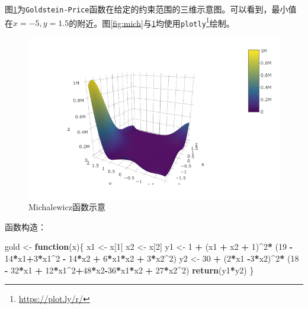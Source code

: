 \documentclass[]{ctexbook}
\newenvironment{Shaded}{\begin{snugshade}}{\end{snugshade}}
\newcommand{\KeywordTok}[1]{\textcolor[rgb]{0.13,0.29,0.53}{\textbf{#1}}}
\newcommand{\DecValTok}[1]{\textcolor[rgb]{0.00,0.00,0.81}{#1}}
\newcommand{\StringTok}[1]{\textcolor[rgb]{0.31,0.60,0.02}{#1}}
\newcommand{\ControlFlowTok}[1]{\textcolor[rgb]{0.13,0.29,0.53}{\textbf{#1}}}
\newcommand{\OperatorTok}[1]{\textcolor[rgb]{0.81,0.36,0.00}{\textbf{#1}}}
\newcommand{\NormalTok}[1]{#1}
\renewcommand{\href}[2]{#2\footnote{\url{#1}}}
\theoremstyle{definition}
\theoremstyle{definition}
\theoremstyle{definition}
\theoremstyle{remark}
\begin{document}
图\ref{fig:gold}为\texttt{Goldstein-Price}函数在给定的约束范围的三维示意图。可以看到，最小值在\(x = -5,y = 1.5\)的附近。图\ref{fig:mich}与\ref{fig:gold}均使用\href{https://plot.ly/r/}{\texttt{plotly}}绘制。

\begin{figure}

{\centering \includegraphics[width=0.8\linewidth]{img/gold} 

}

\caption{ Michalewicz函数示意}\label{fig:gold}
\end{figure}

函数构造：

\begin{Shaded}
\begin{Highlighting}[]
\NormalTok{gold <-}\StringTok{ }\ControlFlowTok{function}\NormalTok{(x)\{}
\NormalTok{  x1 <-}\StringTok{ }\NormalTok{x[}\DecValTok{1}\NormalTok{]}
\NormalTok{  x2 <-}\StringTok{ }\NormalTok{x[}\DecValTok{2}\NormalTok{]}
\NormalTok{  y1 <-}\StringTok{ }\DecValTok{1} \OperatorTok{+}\StringTok{ }\NormalTok{(x1 }\OperatorTok{+}\StringTok{ }\NormalTok{x2 }\OperatorTok{+}\StringTok{ }\DecValTok{1}\NormalTok{)}\OperatorTok{^}\DecValTok{2}\OperatorTok{*}
\StringTok{    }\NormalTok{(}\DecValTok{19} \OperatorTok{-}\StringTok{ }\DecValTok{14}\OperatorTok{*}\NormalTok{x1}\OperatorTok{+}\DecValTok{3}\OperatorTok{*}\NormalTok{x1}\OperatorTok{^}\DecValTok{2} \OperatorTok{-}\StringTok{ }\DecValTok{14}\OperatorTok{*}\NormalTok{x2 }\OperatorTok{+}\StringTok{ }\DecValTok{6}\OperatorTok{*}\NormalTok{x1}\OperatorTok{*}\NormalTok{x2 }\OperatorTok{+}\StringTok{ }\DecValTok{3}\OperatorTok{*}\NormalTok{x2}\OperatorTok{^}\DecValTok{2}\NormalTok{)}
\NormalTok{  y2 <-}\StringTok{ }\DecValTok{30} \OperatorTok{+}\StringTok{ }\NormalTok{(}\DecValTok{2}\OperatorTok{*}\NormalTok{x1 }\OperatorTok{-}\DecValTok{3}\OperatorTok{*}\NormalTok{x2)}\OperatorTok{^}\DecValTok{2}\OperatorTok{*}
\StringTok{    }\NormalTok{(}\DecValTok{18} \OperatorTok{-}\StringTok{ }\DecValTok{32}\OperatorTok{*}\NormalTok{x1 }\OperatorTok{+}\StringTok{ }\DecValTok{12}\OperatorTok{*}\NormalTok{x1}\OperatorTok{^}\DecValTok{2}\OperatorTok{+}\DecValTok{48}\OperatorTok{*}\NormalTok{x2}\OperatorTok{-}\DecValTok{36}\OperatorTok{*}\NormalTok{x1}\OperatorTok{*}\NormalTok{x2 }\OperatorTok{+}\StringTok{ }\DecValTok{27}\OperatorTok{*}\NormalTok{x2}\OperatorTok{^}\DecValTok{2}\NormalTok{)}
  \KeywordTok{return}\NormalTok{(y1}\OperatorTok{*}\NormalTok{y2)}
\NormalTok{\}}
\end{Highlighting}
\end{Shaded}
\end{document}
